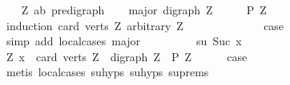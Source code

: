 \begin{isabellebody}
\ \ \isamarkupfalse%
\ Z{\isacharcolon}{\kern0pt}{\isacharcolon}{\kern0pt}\ {\isachardoublequoteopen}{\isacharparenleft}{\kern0pt}{\isacharprime}{\kern0pt}a{\isacharcomma}{\kern0pt}{\isacharprime}{\kern0pt}b{\isacharparenright}{\kern0pt}\ pre{\isacharunderscore}{\kern0pt}digraph{\isachardoublequoteclose}\isanewline
\ \ \isamarkupfalse%
\ major{\isacharcolon}{\kern0pt}\ {\isachardoublequoteopen}digraph\ Z{\isachardoublequoteclose}\isanewline
\ \ \isamarkupfalse%
\ \isamarkupfalse%
\ {\isachardoublequoteopen}P\ Z{\isachardoublequoteclose}\isanewline
\ \ \isamarkupfalse%
\ {\isacharparenleft}{\kern0pt}induction\ {\isachardoublequoteopen}card\ {\isacharparenleft}{\kern0pt}verts\ Z{\isacharparenright}{\kern0pt}{\isachardoublequoteclose}\ arbitrary{\isacharcolon}{\kern0pt}\ Z{\isacharparenright}{\kern0pt}\isanewline
\ \ \ \ \isamarkupfalse%
\ {}\isanewline
\ \ \ \ \isamarkupfalse%
\ \isamarkupfalse%
\ {\isacharquery}{\kern0pt}case\isanewline
\ \ \ \ \ \ \isamarkupfalse%
\ {\isacharparenleft}{\kern0pt}simp\ add{\isacharcolon}{\kern0pt}\ local{\isachardot}{\kern0pt}cases{\isacharparenleft}{\kern0pt}{}{\isacharparenright}{\kern0pt}\ major{\isacharparenright}{\kern0pt}\ \isanewline
\ \ \isamarkupfalse%
\isanewline
\ \ \ \ \isamarkupfalse%
\ su{\isacharcolon}{\kern0pt}\ {\isacharparenleft}{\kern0pt}Suc\ x{\isacharparenright}{\kern0pt}\isanewline
\ \ \ \ \isamarkupfalse%
\ {\isachardoublequoteopen}{\isacharparenleft}{\kern0pt}{\isasymAnd}Z{\isachardot}{\kern0pt}\ x\ {\isacharequal}{\kern0pt}\ card\ {\isacharparenleft}{\kern0pt}verts\ Z{\isacharparenright}{\kern0pt}\ {\isasymLongrightarrow}\ digraph\ Z\ {\isasymLongrightarrow}\ P\ Z{\isacharparenright}{\kern0pt}{\isachardoublequoteclose}\isanewline
\ \ \ \ \isamarkupfalse%
\ {\isacharquery}{\kern0pt}case\isanewline
\ \ \ \ \ \ \isamarkupfalse%
\ {\isacharparenleft}{\kern0pt}metis\ local{\isachardot}{\kern0pt}cases{\isacharparenleft}{\kern0pt}{}{\isacharparenright}{\kern0pt}\ su{\isachardot}{\kern0pt}hyps{\isacharparenleft}{\kern0pt}{}{\isacharparenright}{\kern0pt}\ su{\isachardot}{\kern0pt}hyps{\isacharparenleft}{\kern0pt}{}{\isacharparenright}{\kern0pt}\ su{\isachardot}{\kern0pt}prems{\isacharparenright}{\kern0pt}\ \ \ \isanewline
\ \ \isamarkupfalse%
\ \ \ \isanewline
{}\isamarkupfalse%
%
\endisatagproof

\end{isabellebody}
